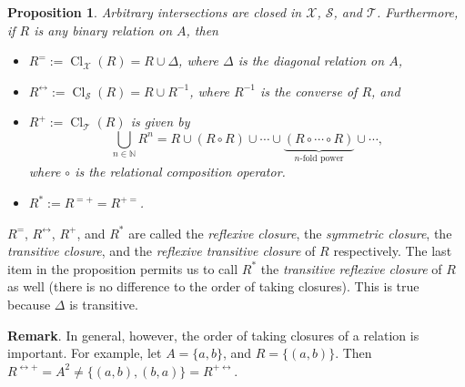 \documentclass[12pt]{article}
\newtheorem{prop}{Proposition}
\begin{document}
\begin{prop} Arbitrary intersections are closed in $\mathcal{X}$, $\mathcal{S}$, and $\mathcal{T}$.  Furthermore, if $R$ is any binary relation on $A$, then 
\begin{itemize}
\item $R^=:=\operatorname{Cl}_{\mathcal{X}}(R)=R\cup \Delta$, where $\Delta$ is the diagonal relation on $A$,
\item $R^{\leftrightarrow}:=\operatorname{Cl}_{\mathcal{S}}(R)=R\cup R^{-1}$, where $R^{-1}$ is the converse of $R$, and
\item $R^+:=\operatorname{Cl}_{\mathcal{T}}(R)$ is given by $$\bigcup_{n\in \mathbb{N}} R^n = R\cup (R\circ R) \cup \cdots \cup \underbrace{(R\circ \cdots \circ R)}_{\displaystyle{n}\mbox{-fold power}} \cup \cdots ,$$
where $\circ$ is the relational composition operator.
\item $R^*:=R^{=+}=R^{+=}$.
\end{itemize}
\end{prop}
$R^=$, $R^{\leftrightarrow}$, $R^+$, and $R^*$ are called the \emph{reflexive closure}, the \emph{symmetric closure}, the \emph{transitive closure}, and the \emph{reflexive transitive closure} of $R$ respectively.  The last item in the proposition permits us to call $R^*$ the \emph{transitive reflexive closure} of $R$ as well (there is no difference to the order of taking closures).  This is true because $\Delta$ is transitive.

\textbf{Remark}.  In general, however, the order of taking closures of a relation is important.  For example, let $A=\lbrace a,b\rbrace$, and $R=\lbrace (a,b)\rbrace$.  Then $R^{\leftrightarrow +}=A^2\ne \lbrace (a,b),(b,a)\rbrace = R^{+ \leftrightarrow}$.
\end{document}
